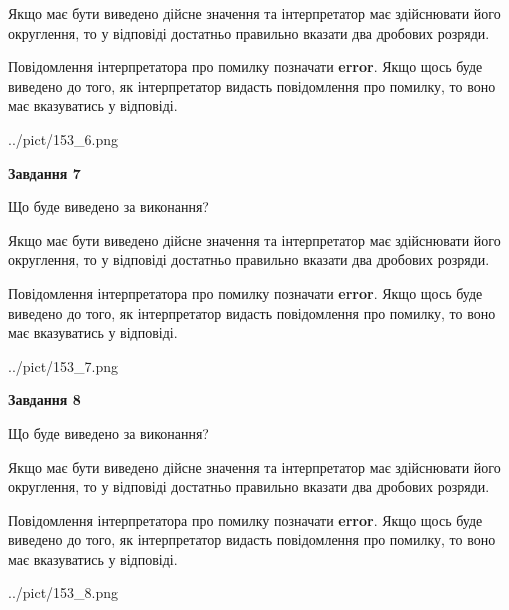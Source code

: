 \documentclass[12pt, ukrainian]{article}
\begin{document}
{\begin {Large}
Якщо має бути виведено дійсне значення та інтерпретатор має здійснювати його округлення, 
то у відповіді достатньо правильно вказати два дробових розряди.

Повідомлення інтерпретатора про помилку позначати \textbf{error}.
Якщо щось буде виведено до того, як інтерпретатор видасть повідомлення про помилку, 
то воно має вказуватись у відповіді. \par

\begin{center}
	{../pict/153_6.png}
\end{center}
\newpage

{\begin {center}\textbf{Завдання 7}\end {center}}\par
Що буде виведено за виконання? \par

Якщо має бути виведено дійсне значення та інтерпретатор має здійснювати його округлення, 
то у відповіді достатньо правильно вказати два дробових розряди.

Повідомлення інтерпретатора про помилку позначати \textbf{error}.
Якщо щось буде виведено до того, як інтерпретатор видасть повідомлення про помилку, 
то воно має вказуватись у відповіді. \par

\begin{center}
	{../pict/153_7.png}
\end{center}
\newpage

{\begin {center}\textbf{Завдання 8}\end {center}}\par
Що буде виведено за виконання? \par

Якщо має бути виведено дійсне значення та інтерпретатор має здійснювати його округлення, 
то у відповіді достатньо правильно вказати два дробових розряди.

Повідомлення інтерпретатора про помилку позначати \textbf{error}.
Якщо щось буде виведено до того, як інтерпретатор видасть повідомлення про помилку, 
то воно має вказуватись у відповіді. \par

\begin{center}
	{../pict/153_8.png}
\end{center}
\newpage


\end{Large}}
\end{document}
